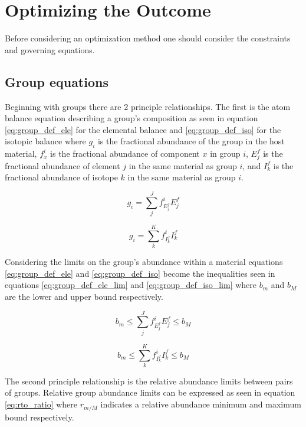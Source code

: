 \documentclass[]{elsarticle}
\begin{document}
\section{Optimizing the Outcome} \label{sec:opt}
Before considering an optimization method one should consider the constraints
and governing equations. 

\subsection{Group equations} \label{ssec:group_eq}
Beginning with groups there are 2 principle relationships. The first is the
atom balance equation describing a group's composition as seen in equation
\ref{eq:group_def_ele} for the elemental balance and \ref{eq:group_def_iso} for
the isotopic balance where $g_{i}$ is the fractional abundance of the 
group in the host material, $f_{x}^{i}$ is the fractional abundance of 
component $x$ in group $i$, $E_{j}^{f}$ is the fractional abundance of element
$j$ in the same material as group $i$, and $I_{k}^{f}$ is the fractional 
abundance of isotope $k$ in the same material as group $i$.

\begin{equation}
\label{eq:group_def_ele}
g_{i} = \sum \limits_{j}^{J} f_{E_{j}^{f}}^{i} E_{j}^{f}
\end{equation} 

\begin{equation}
\label{eq:group_def_iso}
g_{i} = \sum \limits_{k}^{K} f_{I_{k}^{f}}^{i} I_{k}^{f}
\end{equation}

Considering the limits on the group's abundance within a material equations
\ref{eq:group_def_ele} and \ref{eq:group_def_iso} become the inequalities seen
in equations \ref{eq:group_def_ele_lim} and \ref{eq:group_def_iso_lim} where
$b_{m}$ and $b_{M}$ are the lower and upper bound respectively.

\begin{equation}
\label{eq:group_def_ele_lim}
b_m \leq \sum \limits_{j}^{J} f_{E_{j}^{f}}^{i} E_{j}^{f} \leq b_{M}
\end{equation} 

\begin{equation}
\label{eq:group_def_iso_lim}
b_{m} \leq \sum \limits_{k}^{K} f_{I_{k}^{f}}^{i} I_{k}^{f} \leq b_{M} 
\end{equation}

The second principle relationship is the relative abundance limits between pairs
of groups.
Relative group abundance limits can be expressed as seen in equation
\ref{eq:rto_ratio} where $r_{m/M}$ indicates a relative abundance minimum and
maximum bound respectively.
\end{document}
